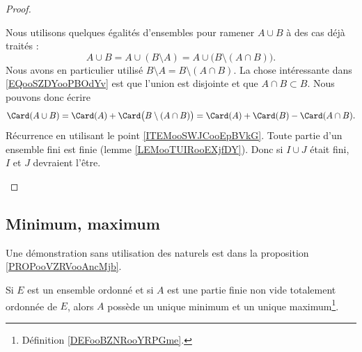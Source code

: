 \begin{proof}
\begin{subproof}
		Nous utilisons quelques égalités d'ensembles pour ramener \( A\cup B\) à des cas déjà traités :
		\begin{equation}        \label{EQooSZDYooPBOdYv}
			A\cup B=A\cup(B\setminus A)=A\cup\big( B\setminus(A\cap B) \big).
		\end{equation}
		Nous avons en particulier utilisé \( B\setminus A=B\setminus(A\cap B)\). La chose intéressante dans \eqref{EQooSZDYooPBOdYv} est que l'union est disjointe et que \( A\cap B\subset B\). Nous pouvons donc écrire
		\begin{equation}
			\Card(A\cup B)=\Card(A)+\Card\big( B\setminus(A\cap B) \big)=\Card(A)+\Card(B)-\Card(A\cap B).
		\end{equation}
		Récurrence en utilisant le point \ref{ITEMooSWJCooEpBVkG}.
		Toute partie d'un ensemble fini est finie (lemme \ref{LEMooTUIRooEXjfDY}). Donc si \( I\cup J\) était fini, \( I\) et \( J\) devraient l'être.
	\end{subproof}
\end{proof}


\subsection{Minimum, maximum}


Une démonstration sans utilisation des naturels est dans la proposition \ref{PROPooVZRVooAncMjb}.
\begin{lemma}       \label{LEMooPCRFooXRGrUr}
	Si \( E\) est un ensemble ordonné et si \( A\) est une partie finie non vide totalement ordonnée de \( E\), alors \( A\) possède un unique minimum et un unique maximum\footnote{Définition \ref{DEFooBZNRooYRPGme}.}.
\end{lemma}

